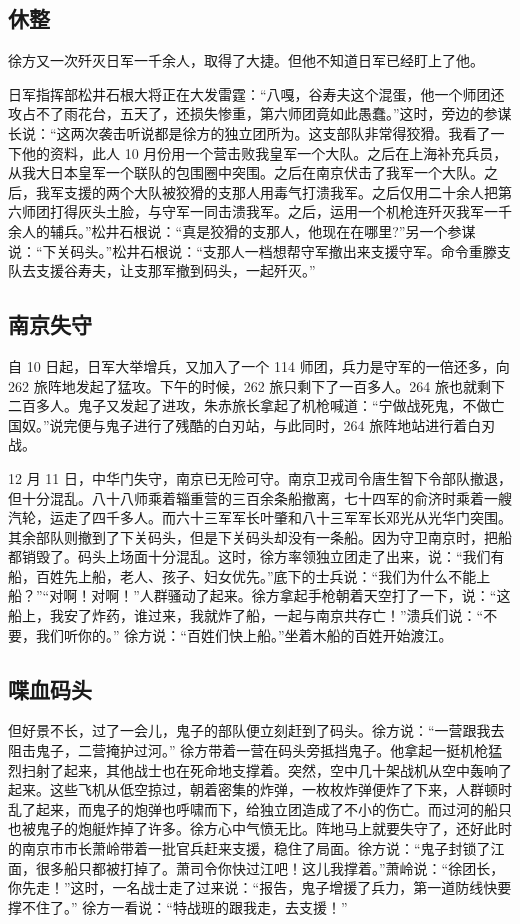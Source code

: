 \documentclass[UTF8,a4paper,titlepage,twoside,10.5pt]{article}
\begin{document}
\subsection{休整}
\label{sec:orgf17476e}

徐方又一次歼灭日军一千余人，取得了大捷。但他不知道日军已经盯上了他。

日军指挥部松井石根大将正在大发雷霆：“八嘎，谷寿夫这个混蛋，他一个师团还攻占不了雨花台，五天了，还损失惨重，第六师团竟如此愚蠢。”这时，旁边的参谋长说：“这两次袭击听说都是徐方的独立团所为。这支部队非常得狡猾。我看了一下他的资料，此人 10 月份用一个营击败我皇军一个大队。之后在上海补充兵员，从我大日本皇军一个联队的包围圈中突围。之后在南京伏击了我军一个大队。之后，我军支援的两个大队被狡猾的支那人用毒气打溃我军。之后仅用二十余人把第六师团打得灰头土脸，与守军一同击溃我军。之后，运用一个机枪连歼灭我军一千余人的辅兵。”松井石根说：“真是狡猾的支那人，他现在在哪里?”另一个参谋说：“下关码头。”松井石根说：“支那人一档想帮守军撤出来支援守军。命令重滕支队去支援谷寿夫，让支那军撤到码头，一起歼灭。”

\subsection{南京失守}
\label{sec:org4344ead}

自 10 日起，日军大举增兵，又加入了一个 114 师团，兵力是守军的一倍还多，向 262 旅阵地发起了猛攻。下午的时候，262 旅只剩下了一百多人。264 旅也就剩下二百多人。鬼子又发起了进攻，朱赤旅长拿起了机枪喊道：“宁做战死鬼，不做亡国奴。”说完便与鬼子进行了残酷的白刃站，与此同时，264 旅阵地站进行着白刃战。

12 月 11 日，中华门失守，南京已无险可守。南京卫戎司令唐生智下令部队撤退，但十分混乱。八十八师乘着辎重营的三百余条船撤离，七十四军的俞济时乘着一艘汽轮，运走了四千多人。而六十三军军长叶肇和八十三军军长邓光从光华门突围。其余部队则撤到了下关码头，但是下关码头却没有一条船。因为守卫南京时，把船都销毁了。码头上场面十分混乱。这时，徐方率领独立团走了出来，说：“我们有船，百姓先上船，老人、孩子、妇女优先。”底下的士兵说：“我们为什么不能上船？”“对啊！对啊！”人群骚动了起来。徐方拿起手枪朝着天空打了一下，说：“这船上，我安了炸药，谁过来，我就炸了船，一起与南京共存亡！”溃兵们说：“不要，我们听你的。” 徐方说：“百姓们快上船。”坐着木船的百姓开始渡江。

\subsection{喋血码头}
\label{sec:orgbddb9fd}

但好景不长，过了一会儿，鬼子的部队便立刻赶到了码头。徐方说：“一营跟我去阻击鬼子，二营掩护过河。” 徐方带着一营在码头旁抵挡鬼子。他拿起一挺机枪猛烈扫射了起来，其他战士也在死命地支撑着。突然，空中几十架战机从空中轰响了起来。这些飞机从低空掠过，朝着密集的炸弹，一枚枚炸弹便炸了下来，人群顿时乱了起来，而鬼子的炮弹也呼啸而下，给独立团造成了不小的伤亡。而过河的船只也被鬼子的炮艇炸掉了许多。徐方心中气愤无比。阵地马上就要失守了，还好此时的南京市市长萧岭带着一批官兵赶来支援，稳住了局面。徐方说：“鬼子封锁了江面，很多船只都被打掉了。萧司令你快过江吧！这儿我撑着。”萧岭说：“徐团长，你先走！”这时，一名战士走了过来说：“报告，鬼子增援了兵力，第一道防线快要撑不住了。” 徐方一看说：“特战班的跟我走，去支援！”
\end{document}
